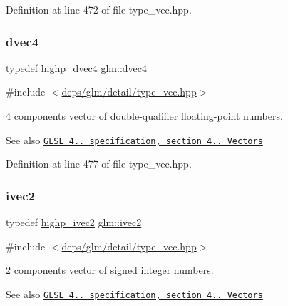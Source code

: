 Definition at line 472 of file type\+\_\+vec.\+hpp.

\mbox{\label{group__core__types_ga0824ceed7ec3b2fba89765501c1540b5}} 
\subsubsection{\texorpdfstring{dvec4}{dvec4}}
{\footnotesize\ttfamily typedef \hyperlink{group__core__precision_ga6e8645fa38f0260e57f1fb7555de0c2f}{highp\+\_\+dvec4} \hyperlink{group__core__types_ga0824ceed7ec3b2fba89765501c1540b5}{glm\+::dvec4}}



{\ttfamily \#include $<$\hyperlink{type__vec_8hpp}{deps/glm/detail/type\+\_\+vec.\+hpp}$>$}

4 components vector of double-\/qualifier floating-\/point numbers.

\begin{DoxySeeAlso}{See also}
\href{http://www.opengl.org/registry/doc/GLSLangSpec.4.20.8.pdf}{\tt G\+L\+SL 4.. specification, section 4.. Vectors} 
\end{DoxySeeAlso}


Definition at line 477 of file type\+\_\+vec.\+hpp.

\mbox{\label{group__core__types_ga9e6ce9cfc7919976b318197e18d8a065}} 
\subsubsection{\texorpdfstring{ivec2}{ivec2}}
{\footnotesize\ttfamily typedef \hyperlink{group__core__precision_gad2b0693752b92e6644be9f1c3e50a451}{highp\+\_\+ivec2} \hyperlink{group__core__types_ga9e6ce9cfc7919976b318197e18d8a065}{glm\+::ivec2}}



{\ttfamily \#include $<$\hyperlink{type__vec_8hpp}{deps/glm/detail/type\+\_\+vec.\+hpp}$>$}

2 components vector of signed integer numbers.

\begin{DoxySeeAlso}{See also}
\href{http://www.opengl.org/registry/doc/GLSLangSpec.4.20.8.pdf}{\tt G\+L\+SL 4.. specification, section 4.. Vectors} 
\end{DoxySeeAlso}


